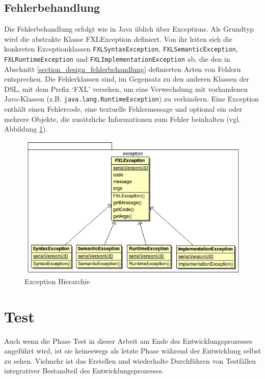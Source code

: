 \section{Fehlerbehandlung}

Die Fehlerbehandlung erfolgt wie in Java üblich über Exceptions. Als Grundtyp wird die abstrakte Klasse FXLException definiert. Von ihr leiten sich die konkreten Exceptionklassen \texttt{FXLSyntaxException}, \texttt{FXLSemanticException}, \texttt{FXLRuntimeException} und \texttt{FXLImplementationException} ab, die den in Abschnitt \ref{section_design_fehlerbehandlung} definierten Arten von Fehlern entsprechen. Die Fehlerklassen sind, im Gegensatz zu den anderen Klassen der DSL, mit dem Prefix `FXL' versehen, um eine Verwechslung mit vorhandenen Java-Klassen (z.B. \texttt{java.\-lang.\-Runtime\-Exception}) zu verhindern. Eine Exception enthält einen Fehlercode, eine textuelle Fehlermessage und optional ein oder mehrere Objekte, die zusätzliche Informationen zum Fehler beinhalten (vgl. Abbildung \ref{abb_exception_hierarchie}).

\begin{figure}[ht]
\includegraphics[scale=0.7]{figures/uml_exception_hierarchy}
\caption{Exception Hierarchie}
\label{abb_exception_hierarchie}
\end{figure}


\chapter{Test}
\label{chapter_test}

Auch wenn die Phase Test in dieser Arbeit am Ende des Entwicklungsprozesses angeführt wird, ist sie keineswegs als letzte Phase während der Entwicklung selbst zu sehen. Vielmehr ist das Erstellen und wiederholte Durchführen von Testfällen integrativer Bestandteil des Entwicklungsprozesses.

